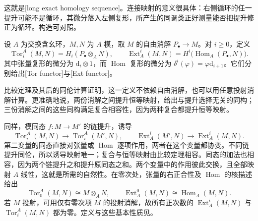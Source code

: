 这就是[long exact homology sequence]。连接映射的意义很具体：右侧循环的任一提升可能不是循环，其微分落入左侧复形，所产生的同调类正好测量能否把提升修正为循环。构造可对照\cite[附录B，第274--275页]{Matsumura1989}。

\begin{definition}\label{g5:def:ext-tor}
	设 \(A\) 为交换含幺环，\(M,N\) 为 \(A\) 模，取 \(M\) 的自由消解 \(P_\bullet\to M\)。对 \(i\geq0\)，定义
	\[
		\operatorname{Tor}_i^A(M,N)
		=H_i(P_\bullet\otimes_A N),\qquad
		\operatorname{Ext}^i_A(M,N)
		=H^i\bigl(\operatorname{Hom}_A(P_\bullet,N)\bigr).
	\]
	其中张量复形的微分为 \(\mathrm{d}_i\otimes1\)，而
	\(\operatorname{Hom}\) 复形的微分为
	\(\delta^i(\varphi)=\varphi \mathrm{d}_{i+1}\)。它们分别给出[Tor functor]与[Ext functor]。
\end{definition}

比较定理及其后的同伦计算证明，这一定义不依赖自由消解，也可以用任意投射消解计算。更准确地说，两份消解之间提升恒等映射，给出与提升选择无关的同构；三份消解之间的这些同构满足复合相容性，因为两种复合都提升恒等映射。

\ProseParagraphBreak

同样，模同态 \(f:M\to M'\) 的链提升，诱导
\[
	\operatorname{Tor}_i^A(M,N)\longrightarrow
	\operatorname{Tor}_i^A(M',N),\qquad
	\operatorname{Ext}^i_A(M',N)\longrightarrow
	\operatorname{Ext}^i_A(M,N).
\]
第二变量的同态直接对张量或 \(\operatorname{Hom}\) 逐项作用，两者在这个变量都协变。不同链提升同伦，所以诱导映射唯一；复合与恒等映射由比较定理相容。同态的加法也相容，因为两个链提升之和提升原同态之和。两个变量中的作用彼此交换，且全部映射 \(A\) 线性，这就是所需的自然性。在零次处，张量的右正合性及 \(\operatorname{Hom}\) 的核描述给出
\begin{equation}\label{g5:eq:ext-tor-degree-zero}
	\operatorname{Tor}_0^A(M,N)\cong M\otimes_A N,\qquad
	\operatorname{Ext}^0_A(M,N)\cong\operatorname{Hom}_A(M,N).
\end{equation}
若 \(M\) 投射，可用仅有零次项 \(M\) 的投射消解，故所有正次数的 \(\operatorname{Ext}^i_A(M,N)\) 与 \(\operatorname{Tor}_i^A(M,N)\) 都为零。定义与这些基本性质见\cite[附录B，第278--280页]{Matsumura1989}。

